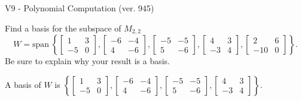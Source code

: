 \begin{exercise}
  \begin{exerciseTitle}V9 - Polynomial Computation (ver. 945)\end{exerciseTitle}
  \begin{exerciseStatement}
    Find a basis for the subspace of \(M_{2,2}\) 
\[W=\mathrm{span}\ \left\{\left[\begin{array}{cc}
1 & 3 \\
-5 & 0
\end{array}\right] , \left[\begin{array}{cc}
-6 & -4 \\
4 & -6
\end{array}\right] , \left[\begin{array}{cc}
-5 & -5 \\
5 & -6
\end{array}\right] , \left[\begin{array}{cc}
4 & 3 \\
-3 & 4
\end{array}\right] , \left[\begin{array}{cc}
2 & 6 \\
-10 & 0
\end{array}\right]\right\}.\]
 Be sure to explain why your result is a basis.


  \end{exerciseStatement}
  \begin{exerciseAnswer}
   A basis of \(W\) is  \(\left\{\left[\begin{array}{cc}
1 & 3 \\
-5 & 0
\end{array}\right] , \left[\begin{array}{cc}
-6 & -4 \\
4 & -6
\end{array}\right] , \left[\begin{array}{cc}
-5 & -5 \\
5 & -6
\end{array}\right] , \left[\begin{array}{cc}
4 & 3 \\
-3 & 4
\end{array}\right]\right\}\).
  


  \end{exerciseAnswer}
\end{exercise}